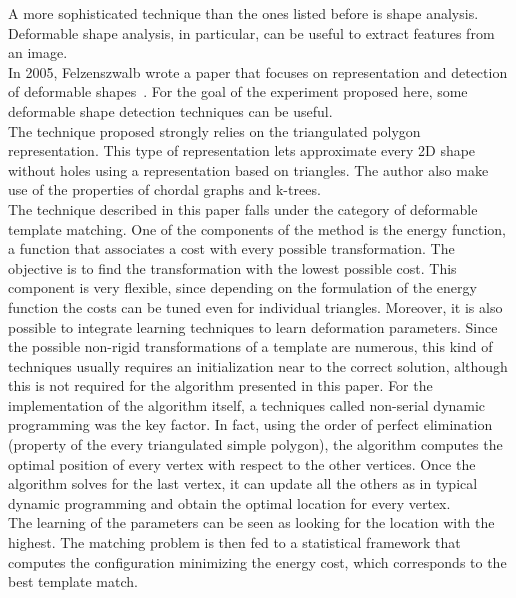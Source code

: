 \documentclass[conference]{IEEEtran}
\begin{document}
					A more sophisticated technique than the ones listed before is shape analysis. Deformable shape analysis, in particular, can be useful to extract features from an image.\\
					In 2005, Felzenszwalb wrote a paper that focuses on representation and detection of deformable shapes~\cite{felzenszwalb2005representation}. For the goal of the experiment proposed here, some deformable shape 
					detection techniques can be useful. \\
					The technique proposed strongly relies on the triangulated polygon representation. This type of representation lets approximate every 2D shape without holes using a representation based on triangles. 
					The author also make use of the properties of chordal graphs and k-trees.\\
					The technique described in this paper falls under the category of deformable template matching. One of the components of the method is the energy function, a function that associates a cost with every 
					possible transformation. The objective is to find the transformation with the lowest possible cost. This component is very flexible, since depending on the formulation of the energy function the costs 
					can be tuned even for individual triangles. Moreover, it is also possible to integrate learning techniques to learn deformation parameters.
					Since the possible non-rigid transformations of a template are numerous, this kind of techniques usually requires an initialization near to the correct solution, 
					although this is not required for the algorithm presented in this paper. 
					For the implementation of the algorithm itself, a techniques called non-serial dynamic programming was the key factor. In fact, using the order of perfect elimination (property of the every triangulated 
					simple polygon), the algorithm computes the optimal position of every vertex with respect to the other vertices. Once the algorithm solves for the last vertex, it can 
					update all the others as in typical dynamic programming and obtain the optimal location for every vertex.\\
					The learning of the parameters can be seen as looking for the location with the highest. The matching problem is then fed to a statistical framework that computes the configuration minimizing the 
					energy cost, which corresponds to the best template match.
					
\end{document}

